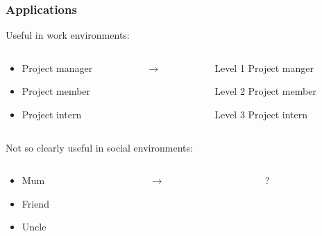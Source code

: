 \documentclass{beamer}
\begin{document}
  
  \begin{frame}
  	\frametitle{Applications}
  	Useful in work environments:
  	\begin{columns}
  		\begin{column}[T]{4cm}
	 	 	\begin{itemize}
	 	 		\itemsep1em
  				\item Project manager
  				\item Project member
  				\item Project intern
 			\end{itemize}
		\end{column}
	
		\begin{column}[T]{1cm}
			\vspace*{1cm}
			$\boldsymbol{\longrightarrow}$
			
		\end{column}
	
		\begin{column}[T]{4cm}
			\begin{block}{Level 1}
				Project manger
			\end{block}
			\begin{block}{Level 2}
				Project member
			\end{block}
			\begin{block}{Level 3}
				Project intern
			\end{block}
		\end{column}
 	
  	\end{columns}
  	\vspace*{0.3cm}
 	 Not so clearly useful in social environments: 
  	\begin{columns}
  		\begin{column}[T]{4cm}
	 	 	\begin{itemize}
  				\item Mum
  				\item Friend
  				\item Uncle
 			\end{itemize}
		\end{column}
	
		\begin{column}[T]{1cm}
			\vspace*{1cm}
			$\boldsymbol{\longrightarrow}$
		\end{column}
	
		\begin{column}[T]{4cm}
			\vspace*{1cm}
			?
		\end{column}
		\end{columns}
  
  \end{frame}
  
\end{document}
